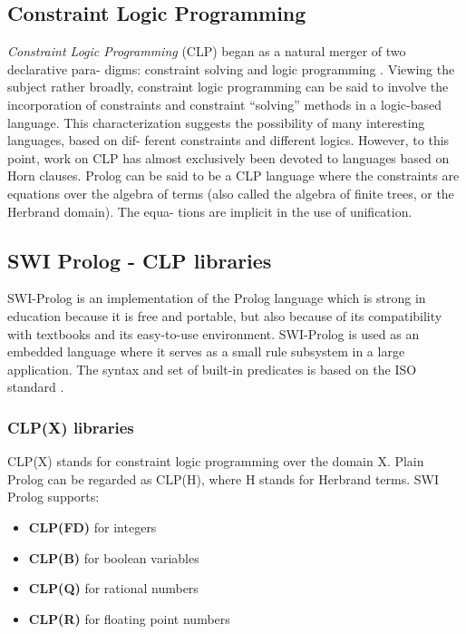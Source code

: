 \subsection{Constraint Logic Programming}\label{subsec:clp}

\textit{Constraint Logic Programming} (CLP) began as a natural merger of two declarative para-
digms: constraint solving and logic programming \cite{JAFFAR1994503}.\newline
Viewing the subject rather broadly, constraint logic programming can be said to involve the
incorporation of constraints and constraint “solving” methods in a logic-based language.
This characterization suggests the possibility of many interesting languages, based on dif-
ferent constraints and different logics. However, to this point, work on CLP has almost
exclusively been devoted to languages based on Horn clauses.\newline
Prolog can be said to be a CLP language where the constraints are equations over the
algebra of terms (also called the algebra of finite trees, or the Herbrand domain). The equa-
tions are implicit in the use of unification.

\subsection{SWI Prolog - CLP libraries}\label{subsec:clp_swi}

SWI-Prolog is an implementation of the Prolog language which is strong in education because it is free and portable, but also because of its compatibility with textbooks and its easy-to-use environment.\newline
SWI-Prolog is used as an embedded language where it serves as a small rule subsystem in a large application. The syntax and set of built-in predicates is based on the ISO standard \cite{SWI-Prolog}.

\subsubsection{CLP(X) libraries}\label{subsubsec:clp_libraries}
CLP(X) stands for constraint logic programming over the domain X. Plain Prolog can be regarded as CLP(H), where H stands for Herbrand terms.\newline
SWI Prolog supports:\newline
\begin{itemize}
    \item \textbf{CLP(FD)} for integers
    \item \textbf{CLP(B)} for boolean variables
    \item \textbf{CLP(Q)} for rational numbers
    \item \textbf{CLP(R)} for floating point numbers
\end{itemize}

